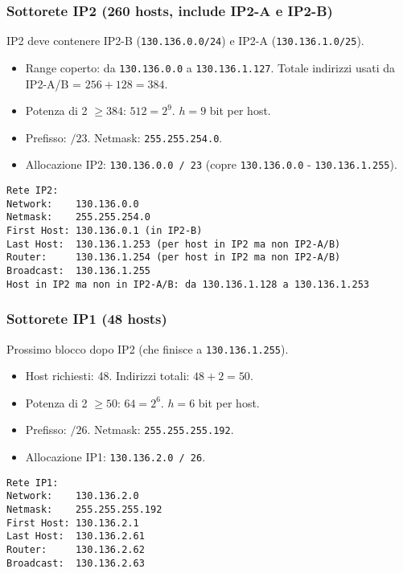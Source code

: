\documentclass{article}
\begin{document}
\subsubsection{Sottorete IP2 (260 hosts, include IP2-A e IP2-B)}
IP2 deve contenere IP2-B (\texttt{130.136.0.0/24}) e IP2-A (\texttt{130.136.1.0/25}).
\begin{itemize}
    \item Range coperto: da \texttt{130.136.0.0} a \texttt{130.136.1.127}. Totale indirizzi usati da IP2-A/B = $256 + 128 = 384$.
    \item Potenza di 2 $\geq 384$: $512 = 2^9$. $h=9$ bit per host.
    \item Prefisso: $/23$. Netmask: \texttt{255.255.254.0}.
    \item Allocazione IP2: \texttt{130.136.0.0 / 23} (copre \texttt{130.136.0.0} - \texttt{130.136.1.255}).
\end{itemize}
\begin{verbatim}
Rete IP2:
Network:    130.136.0.0
Netmask:    255.255.254.0
First Host: 130.136.0.1 (in IP2-B)
Last Host:  130.136.1.253 (per host in IP2 ma non IP2-A/B)
Router:     130.136.1.254 (per host in IP2 ma non IP2-A/B)
Broadcast:  130.136.1.255
Host in IP2 ma non in IP2-A/B: da 130.136.1.128 a 130.136.1.253
\end{verbatim}

\subsubsection{Sottorete IP1 (48 hosts)}
Prossimo blocco dopo IP2 (che finisce a \texttt{130.136.1.255}).
\begin{itemize}
    \item Host richiesti: 48. Indirizzi totali: $48 + 2 = 50$.
    \item Potenza di 2 $\geq 50$: $64 = 2^6$. $h=6$ bit per host.
    \item Prefisso: $/26$. Netmask: \texttt{255.255.255.192}.
    \item Allocazione IP1: \texttt{130.136.2.0 / 26}.
\end{itemize}
\begin{verbatim}
Rete IP1:
Network:    130.136.2.0
Netmask:    255.255.255.192
First Host: 130.136.2.1
Last Host:  130.136.2.61
Router:     130.136.2.62
Broadcast:  130.136.2.63
\end{verbatim}
\end{document}
